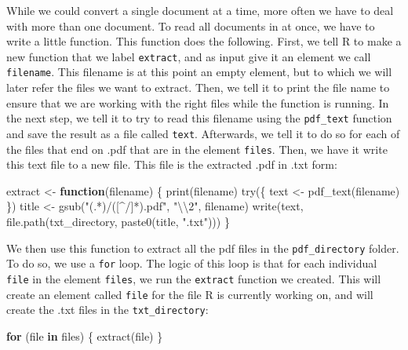 \documentclass[
]{book}
\newenvironment{Shaded}{\begin{snugshade}}{\end{snugshade}}
\newcommand{\ControlFlowTok}[1]{\textcolor[rgb]{0.13,0.29,0.53}{\textbf{#1}}}
\newcommand{\FunctionTok}[1]{\textcolor[rgb]{0.00,0.00,0.00}{#1}}
\newcommand{\NormalTok}[1]{#1}
\newcommand{\OtherTok}[1]{\textcolor[rgb]{0.56,0.35,0.01}{#1}}
\newcommand{\SpecialCharTok}[1]{\textcolor[rgb]{0.00,0.00,0.00}{#1}}
\newcommand{\StringTok}[1]{\textcolor[rgb]{0.31,0.60,0.02}{#1}}
\begin{document}
While we could convert a single document at a time, more often we have to deal with more than one document. To read all documents in at once, we have to write a little function. This function does the following. First, we tell R to make a new function that we label \texttt{extract}, and as input give it an element we call \texttt{filename}. This filename is at this point an empty element, but to which we will later refer the files we want to extract. Then, we tell it to print the file name to ensure that we are working with the right files while the function is running. In the next step, we tell it to try to read this filename using the \texttt{pdf\_text} function and save the result as a file called \texttt{text}. Afterwards, we tell it to do so for each of the files that end on .pdf that are in the element \texttt{files}. Then, we have it write this text file to a new file. This file is the extracted .pdf in .txt form:

\begin{Shaded}
\begin{Highlighting}[]
\NormalTok{extract }\OtherTok{\textless{}{-}} \ControlFlowTok{function}\NormalTok{(filename) \{}
    \FunctionTok{print}\NormalTok{(filename)}
    \FunctionTok{try}\NormalTok{(\{}
\NormalTok{        text }\OtherTok{\textless{}{-}} \FunctionTok{pdf\_text}\NormalTok{(filename)}
\NormalTok{    \})}
\NormalTok{    title }\OtherTok{\textless{}{-}} \FunctionTok{gsub}\NormalTok{(}\StringTok{"(.*)/([\^{}/]*).pdf"}\NormalTok{, }\StringTok{"}\SpecialCharTok{\textbackslash{}\textbackslash{}}\StringTok{2"}\NormalTok{, filename)}
    \FunctionTok{write}\NormalTok{(text, }\FunctionTok{file.path}\NormalTok{(txt\_directory, }\FunctionTok{paste0}\NormalTok{(title, }\StringTok{".txt"}\NormalTok{)))}
\NormalTok{\}}
\end{Highlighting}
\end{Shaded}

We then use this function to extract all the pdf files in the \texttt{pdf\_directory} folder. To do so, we use a \texttt{for} loop. The logic of this loop is that for each individual \texttt{file} in the element \texttt{files}, we run the \texttt{extract} function we created. This will create an element called \texttt{file} for the file R is currently working on, and will create the .txt files in the \texttt{txt\_directory}:

\begin{Shaded}
\begin{Highlighting}[]
\ControlFlowTok{for}\NormalTok{ (file }\ControlFlowTok{in}\NormalTok{ files) \{}
    \FunctionTok{extract}\NormalTok{(file)}
\NormalTok{\}}
\end{Highlighting}
\end{Shaded}
\end{document}
